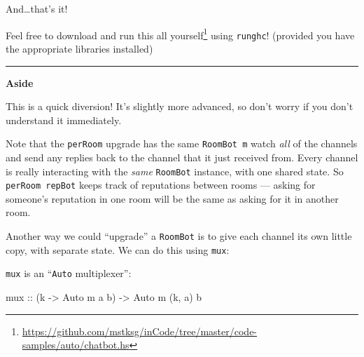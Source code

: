 \documentclass[]{article}
\newenvironment{Shaded}{}{}
\newcommand{\CommentTok}[1]{\textcolor[rgb]{0.38,0.63,0.69}{\textit{#1}}}
\newcommand{\DataTypeTok}[1]{\textcolor[rgb]{0.56,0.13,0.00}{#1}}
\newcommand{\FunctionTok}[1]{\textcolor[rgb]{0.02,0.16,0.49}{#1}}
\newcommand{\KeywordTok}[1]{\textcolor[rgb]{0.00,0.44,0.13}{\textbf{#1}}}
\newcommand{\NormalTok}[1]{#1}
\newcommand{\OtherTok}[1]{\textcolor[rgb]{0.00,0.44,0.13}{#1}}
\renewcommand{\href}[2]{#2\footnote{\url{#1}}}
\begin{document}
And\ldots{}that's it!

Feel free to
\href{https://github.com/mstksg/inCode/tree/master/code-samples/auto/chatbot.hs}{download
and run this all yourself} using \texttt{runghc}! (provided you have the
appropriate libraries installed)

\begin{center}\rule{0.5\linewidth}{\linethickness}\end{center}

\textbf{Aside}

This is a quick diversion! It's slightly more advanced, so don't worry if you
don't understand it immediately.

Note that the \texttt{perRoom} upgrade has the same \texttt{RoomBot\ m} watch
\emph{all} of the channels and send any replies back to the channel that it just
received from. Every channel is really interacting with the \emph{same}
\texttt{RoomBot} instance, with one shared state. So \texttt{perRoom\ repBot}
keeps track of reputations between rooms --- asking for someone's reputation in
one room will be the same as asking for it in another room.

Another way we could ``upgrade'' a \texttt{RoomBot} is to give each channel its
own little copy, with separate state. We can do this using \texttt{mux}:

\begin{Shaded}
\end{Shaded}

\texttt{mux} is an ``\texttt{Auto} multiplexer'':

\begin{Shaded}
\begin{Highlighting}[]
\OtherTok{mux ::}\NormalTok{ (k }\OtherTok{->} \DataTypeTok{Auto}\NormalTok{ m a b) }\OtherTok{->} \DataTypeTok{Auto}\NormalTok{ m (k, a) b}
\end{Highlighting}
\end{Shaded}
\end{document}
